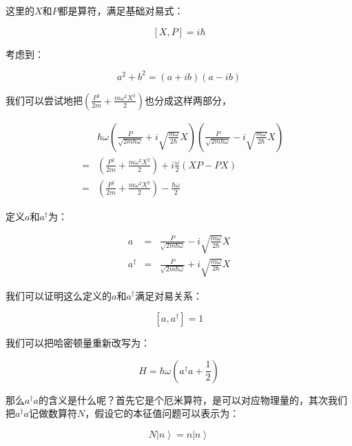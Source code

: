 这里的$X$和$P$都是算符，满足基础对易式：

\begin{equation}
\left[X, P \right] = i \hbar
\end{equation}

考虑到：

\begin{equation}
a^2 + b^2 = \left( a + ib \right) \left( a - ib \right) 
\end{equation}

我们可以尝试地把$\left( \frac{P^2}{2m} + \frac{m \omega^2 X^2}{2} \right)$也分成这样两部分，

\begin{eqnarray*}
{} & {} & \hbar \omega \left( \frac{P}{\sqrt{ 2m \hbar \omega }}  + i \sqrt{ \frac{m \omega }{2 \hbar} } X  \right) \left( \frac{P}{\sqrt{ 2m \hbar \omega }}  - i \sqrt{ \frac{m \omega }{2 \hbar} } X  \right)\\
{} & = & \left( \frac{P^2}{2m} + \frac{m \omega^2 X^2}{2} \right) + i \frac{\omega}{2} \left( XP - PX \right) \\
{} & = & \left( \frac{P^2}{2m} + \frac{m \omega^2 X^2}{2} \right) - \frac{\hbar \omega}{2}
\end{eqnarray*}

定义$a$和$a^\dagger$为：

\begin{eqnarray}
a &=& \frac{P}{\sqrt{ 2m \hbar \omega }} - i \sqrt{ \frac{m \omega }{2 \hbar} } X \\
a^\dagger &=& \frac{P}{\sqrt{ 2m \hbar \omega }}  + i \sqrt{ \frac{m \omega }{2 \hbar} } X
\end{eqnarray}

我们可以证明这么定义的$a$和$a^\dagger$满足对易关系：

\begin{equation}
\left[ a, a^\dagger  \right] = 1
\end{equation}

我们可以把哈密顿量重新改写为：

\begin{equation}
H = \hbar \omega \left( a^\dagger a + \frac{1}{2} \right)
\end{equation}

那么$a^\dagger a$的含义是什么呢？首先它是个厄米算符，是可以对应物理量的，其次我们把$a^\dagger a$记做数算符$N$，假设它的本征值问题可以表示为：

\begin{equation}
N \left| n \right\rangle = n \left| n \right\rangle
\end{equation}

